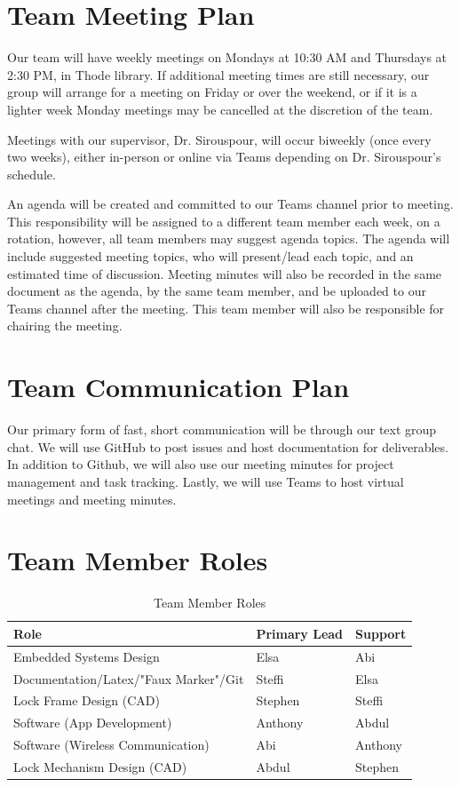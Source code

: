 \documentclass{article}
\begin{document}
\section{Team Meeting Plan}

Our team will have weekly meetings on Mondays at 10:30 AM and Thursdays at 2:30 PM, in Thode library. If additional meeting times are still necessary, our group will arrange for a meeting on Friday or over the weekend, or if it is a lighter week Monday meetings may be cancelled at the discretion of the team.

Meetings with our supervisor, Dr. Sirouspour, will occur biweekly (once every two weeks), either in-person or online via Teams depending on Dr. Sirouspour's schedule.

An agenda will be created and committed to our Teams channel prior to meeting.  This responsibility will be assigned to a different team member each week, on a rotation, however, all team members may suggest agenda topics.  The agenda will include suggested meeting topics, who will present/lead each topic, and an estimated time of discussion. Meeting minutes will also be recorded in the same document as the agenda, by the same team member, and be uploaded to our Teams channel after the meeting.  This team member will also be responsible for chairing the meeting. 

\section{Team Communication Plan}

Our primary form of fast, short communication will be through our text group chat. We will use GitHub to post issues and host documentation for deliverables.  In addition to Github, we will also use our meeting minutes for project management and task tracking.  Lastly, we will use Teams to host virtual meetings and meeting minutes.

\section{Team Member Roles}

\begin{table}[h]
\caption{Team Member Roles} \label{TblTeamMemberRoles}
\begin{tabularx}{\textwidth}{llX}
\toprule
\textbf{Role} & \textbf{Primary Lead} & \textbf{Support}\\
\midrule
Embedded Systems Design & Elsa & Abi\\
Documentation/Latex/"Faux Marker"/Git & Steffi & Elsa\\
Lock Frame Design (CAD) & Stephen & Steffi\\
Software (App Development) & Anthony & Abdul\\
Software (Wireless Communication) & Abi & Anthony\\
Lock Mechanism Design (CAD) & Abdul & Stephen\\
\bottomrule
\end{tabularx}
\end{table}
\end{document}

